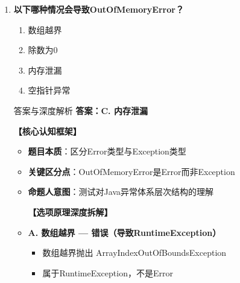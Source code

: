 \documentclass[12pt, a4paper]{ctexart}
\begin{document}
\begin{enumerate}[label=\textbf{\arabic*.}]
\begin{bluebox}{答案与深度解析}
\begin{itemize}[label={}, leftmargin=*, nosep]
		      \textbf{命题陷阱破解}：
		      \begin{itemize}[label={}, leftmargin=*, nosep]
			      \item 陷阱1："catch执行了finally才执行" → 错！正常流程try执行完就执行finally
			      \item 陷阱2："return会跳过finally" → 错！return会等待finally完成
		      \end{itemize}

		      \textbf{【命题趋势与实战策略】}

		      \textbf{考场秒杀}：牢记finally三字真言——"必然执行"
		      \end{itemize}

	      \end{bluebox}

	      \vspace{1em}

	\item \textbf{以下哪种情况会导致OutOfMemoryError？}
	      \begin{enumerate}[label=\Alph*.]
		      \item 数组越界
		      \item 除数为0
		      \item 内存泄漏
		      \item 空指针异常
	      \end{enumerate}

	      \begin{bluebox}{答案与深度解析}
		      \textbf{答案：C. 内存泄漏}

		      \textbf{【核心认知框架】}
		      \begin{itemize}[label={}, leftmargin=*, nosep]
			      \item \textbf{题目本质}：区分Error类型与Exception类型
			      \item \textbf{关键区分点}：OutOfMemoryError是Error而非Exception
			      \item \textbf{命题人意图}：测试对Java异常体系层次结构的理解

		      \textbf{【选项原理深度拆解】}

		      \item \textbf{A. 数组越界 — 错误（导致RuntimeException）}
		      \begin{itemize}[label={}, leftmargin=*, nosep]
			      \item 数组越界抛出 ArrayIndexOutOfBoundsException
			      \item 属于RuntimeException，不是Error
		      \end{itemize}


\end{itemize}
\end{bluebox}
\end{enumerate}
\end{document}
